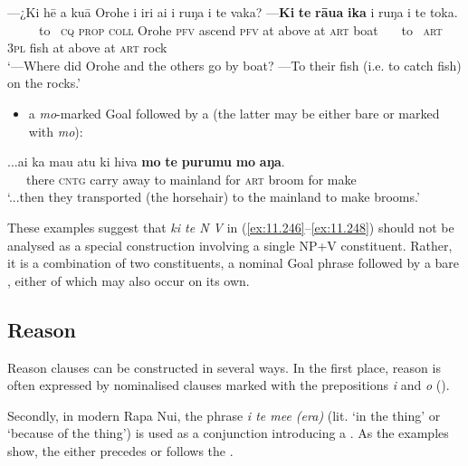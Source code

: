 \ea\label{ex:11.252}
\gll —¿Ki hē a kuā {\ꞌ}Orohe i iri ai {\ꞌ}i ruŋa i te vaka?  —\textbf{Ki} \textbf{te} \textbf{rāua} \textbf{ika} {\ꞌ}i ruŋa i te toka.\\
~~~~~to~ \textsc{cq} \textsc{prop} \textsc{coll} Orohe \textsc{pfv} ascend \textsc{pfv} at above at \textsc{art} boat  ~~~to~ \textsc{art} \textsc{3pl} fish at above at \textsc{art} rock\\

\glt
‘—Where did Orohe and the others go by boat? —To their fish (i.e. to catch fish) on the rocks.’ \textstyleExampleref{[R154.038]}\textstyleExampleref{} 
\z

\begin{itemize}
\item 
a \textit{mo}{}-marked Goal  followed by a  (the latter may be either bare or marked with \textit{mo}):
\end{itemize}

\ea\label{ex:11.253}
\gll ...{\ꞌ}ai ka ma{\ꞌ}u atu ki hiva \textbf{mo} \textbf{te} \textbf{purumu} \textbf{mo} \textbf{aŋa}. \\
~~~there \textsc{cntg} carry away to mainland for \textsc{art} broom for make \\

\glt
‘...then they transported (the horsehair) to the mainland to make brooms.’ \textstyleExampleref{[R539-02.091]}
\z

These examples suggest that \textit{ki te N V} in (\ref{ex:11.246}–\ref{ex:11.248}) should not be analysed as a special construction involving a single NP+V constituent. Rather, it is a combination of two constituents, a nominal Goal phrase followed by a bare , either of which may also occur on its own. 

\subsection{Reason}\label{sec:11.6.4}
Reason clauses can be constructed in several ways. In the first place, reason is often expressed by nominalised clauses marked with the prepositions \textit{{\ꞌ}i} and \textit{{\ꞌ}o} (). 

Secondly, in modern Rapa Nui, the phrase \textit{{\ꞌ}i te me{\ꞌ}e (era)} (lit. ‘in the thing’ or ‘because of the thing’) is used as a conjunction introducing a . As the examples show, the  either precedes or follows the .

